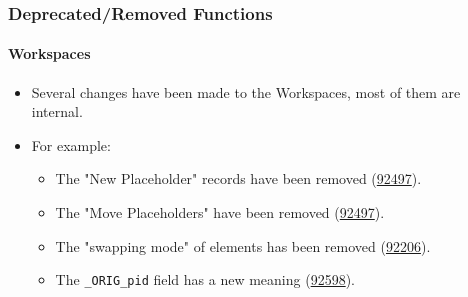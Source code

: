 %

\begin{frame}[fragile]
	\frametitle{Deprecated/Removed Functions}
	\framesubtitle{Workspaces}

	\begin{itemize}
		\item Several changes have been made to the Workspaces, most of them are internal.
		\item For example:

			\begin{itemize}\small
				\item The "New Placeholder" records have been removed
					(\href{https://docs.typo3.org/c/typo3/cms-core/master/en-us/Changelog/11.0/Breaking-92497-WorkspacesMovePlaceholdersRemoved.html}{92497}).
				\item The "Move Placeholders" have been removed
					(\href{https://docs.typo3.org/c/typo3/cms-core/master/en-us/Changelog/11.0/Breaking-92497-WorkspacesMovePlaceholdersRemoved.html}{92497}).
				\item The "swapping mode" of elements has been removed
					(\href{https://docs.typo3.org/c/typo3/cms-core/master/en-us/Changelog/11.0/Breaking-92206-RemoveWorkspaceSwappingOfElements.html}{92206}).
				\item The \texttt{\_ORIG\_pid} field has a new meaning
					(\href{https://docs.typo3.org/c/typo3/cms-core/master/en-us/Changelog/11.0/Breaking-92598-Workspace-overlaysAuto-fixThePIDValueForMovedRecords.html}{92598}).
			\end{itemize}

	\end{itemize}

\end{frame}

